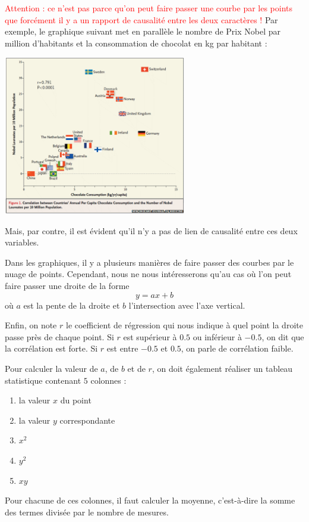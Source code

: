 \textcolor{red}{Attention : ce n'est pas parce qu'on peut faire passer une courbe par les points que forcément il y a un rapport de causalité entre les deux caractères !} Par exemple, le graphique suivant met en parallèle le nombre de Prix Nobel par million d'habitants et la consommation de chocolat en kg par habitant :
\begin{center}
\includegraphics[width = 0.6\textwidth]{statistiques/image/chocolat.png}
\end{center}
Mais, par contre, il est évident qu'il n'y a pas de lien de causalité entre ces deux variables.

Dans les graphiques, il y a plusieurs manières de faire passer des courbes par le nuage de points. Cependant, nous ne nous intéresserons qu'au cas où l'on peut faire passer une droite de la forme
$$
y = ax+b
$$
où $a$ est la pente de la droite et $b$ l'intersection avec l'axe vertical.

Enfin, on note $r$ le coefficient de régression qui nous indique à quel point la droite passe près de chaque point. Si $r$ est supérieur à $0.5$ ou inférieur à $-0.5$, on dit que la corrélation est forte. Si $r$ est entre $-0.5$ et $0.5$, on parle de corrélation faible.

Pour calculer la valeur de $a$, de $b$ et de $r$, on doit également réaliser un tableau statistique contenant $5$ colonnes : 
\begin{enumerate}[colonne 1 :]
\item la valeur $x$ du point
\item la valeur $y$ correspondante
\item $x^2$
\item $y^2$
\item $xy$
\end{enumerate}

Pour chacune de ces colonnes, il faut calculer la moyenne, c'est-à-dire la somme des termes divisée par le nombre de mesures.

